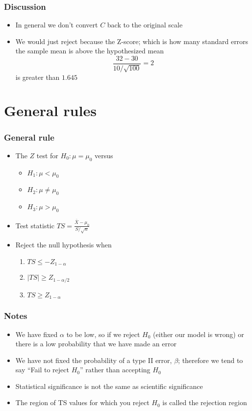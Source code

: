 \documentclass[aspectratio=169]{beamer}
\begin{document}
\begin{frame}\frametitle{Discussion}
\begin{itemize}
\item In general we don't convert $C$ back to the original scale
\item We would just reject because the Z-score; which is how many
  standard errors the sample mean is above the hypothesized mean
  $$
  \frac{32 - 30}{10 / \sqrt{100}} = 2
  $$
  is greater than $1.645$
\end{itemize}

\section{General rules}
\end{frame}
\begin{frame}\frametitle{General rule}
\begin{itemize}
\item The $Z$ test for $H_0:\mu = \mu_0$ versus 
  \begin{itemize}
  \item $H_1: \mu < \mu_0$
  \item $H_2: \mu \neq \mu_0$
  \item $H_3: \mu > \mu_0$ 
  \end{itemize}
 \item Test statistic $ TS = \frac{\bar{X} - \mu_0}{S / \sqrt{n}} $
 \item Reject the null hypothesis when 
  \begin{enumerate}[$H_1:$]
  \item $TS \leq -Z_{1 - \alpha}$
  \item $|TS| \geq Z_{1 - \alpha / 2}$
  \item $TS \geq Z_{1 - \alpha}$
  \end{enumerate}
\end{itemize}

\end{frame}
\begin{frame}\frametitle{Notes}
\begin{itemize}
\item We have fixed $\alpha$ to be low, so if we reject $H_0$ (either
  our model is wrong) or there is a low probability that we have made
  an error
\item We have not fixed the probability of a type II error, $\beta$;
  therefore we tend to say ``Fail to reject $H_0$'' rather than
  accepting $H_0$
\item Statistical significance is not the same as scientific
  significance
\item The region of TS values for which you reject $H_0$ is called the
  rejection region
\end{itemize}
\end{frame}
\end{document}
